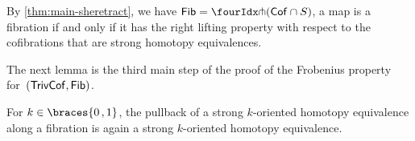 \documentclass[reqno,10pt,a4paper,oneside,draft]{amsart}
\begin{document}
{{\begin{remark} \label{fib-and-she}
By \cref{thm:main-sheretract}, we have $\Fib = \liftr{(\Cof \cap S)}$, \ie a map is a fibration if and only if it has the right lifting property with respect to the cofibrations that are strong homotopy equivalences.
\end{remark}

The next lemma is the third main step of the proof of the Frobenius property for~$(\mathsf{TrivCof}, \mathsf{Fib})$.

\begin{lemma} \label{thm:non-alg-frobenius-she}
For $k \in \braces{0\,, 1}$, the pullback of a strong $k$-oriented homotopy equivalence along a fibration is again a strong $k$-oriented homotopy equivalence.
\end{lemma}

}}
\end{document}
